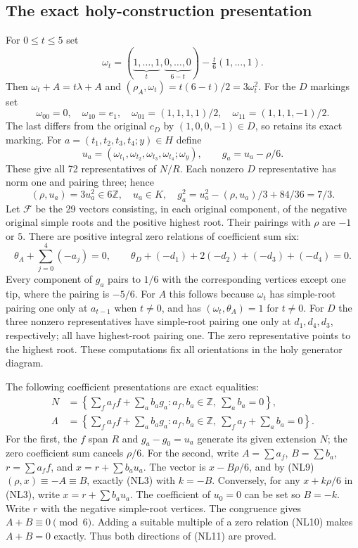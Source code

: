 \subsection{The exact holy-construction presentation}

For $0\le t\le5$ set
\[
 \omega_t=(\underbrace{1,\ldots,1}_{t},
             \underbrace{0,\ldots,0}_{6-t})-\tfrac t6(1,\ldots,1).
\]
Then $\omega_t+A=t\lambda+A$ and
$(\rho_A,\omega_t)=t(6-t)/2=3\omega_t^2$.
For the $D$ markings set
\[
 \omega_{00}=0,\quad\omega_{10}=e_1,\quad
 \omega_{01}=(1,1,1,1)/2,\quad
 \omega_{11}=(1,1,1,-1)/2.
\]
The last differs from the original $c_D$ by $(1,0,0,-1)\in D$,
so retains its exact marking.
For $a=(t_1,t_2,t_3,t_4;y)\in H$ define
\[
 u_a=(\omega_{t_1},\omega_{t_2},\omega_{t_3},\omega_{t_4};\omega_y),
 \qquad g_a=u_a-\rho/6.
 \tag{NL8}
\]
These give all 72 representatives of $N/R$. Each nonzero $D$
representative has norm one and pairing three; hence
\[
 (\rho,u_a)=3u_a^2\in6\mathbb Z,\quad
 u_a\in K,\quad g_a^2=u_a^2-(\rho,u_a)/3+84/36=7/3.
 \tag{NL9}
\]
Let $\mathcal F$ be the 29 vectors consisting, in each original
component, of the negative original simple roots and the positive
highest root. Their pairings with $\rho$ are $-1$ or $5$.
There are positive integral zero relations of coefficient sum six:
\[
 \theta_A+\sum_{j=0}^4(-a_j)=0,\qquad
 \theta_D+(-d_1)+2(-d_2)+(-d_3)+(-d_4)=0.
 \tag{NL10}
\]
Every component of $g_a$ pairs to $1/6$ with the corresponding
vertices except one tip, where the pairing is $-5/6$.
For $A$ this follows because $\omega_t$ has simple-root pairing
one only at $a_{t-1}$ when $t\ne0$, and has
$(\omega_t,\theta_A)=1$ for $t\ne0$.
For $D$ the three nonzero representatives have simple-root
pairing one only at $d_1,d_4,d_3$, respectively; all have
highest-root pairing one. The zero representative points to
the highest root. These computations fix all orientations in
the holy generator diagram.

The following coefficient presentations are exact equalities:
\[
 \begin{split}
 N&=\left\{\sum_fa_ff+\sum_ab_ag_a:
                    a_f,b_a\in\mathbb Z,\ \sum_ab_a=0\right\},\\
 \Lambda&=\left\{\sum_fa_ff+\sum_ab_ag_a:
            a_f,b_a\in\mathbb Z,\ \sum_fa_f+\sum_ab_a=0\right\}.
 \end{split}
 \tag{NL11}
\]
For the first, the $f$ span $R$ and $g_a-g_0=u_a$ generate its
given extension $N$; the zero coefficient sum cancels $\rho/6$.
For the second, write $A=\sum a_f$, $B=\sum b_a$,
$r=\sum a_ff$, and $x=r+\sum b_au_a$.
The vector is $x-B\rho/6$, and by (NL9)
$(\rho,x)\equiv-A\equiv B$, exactly (NL3) with $k=-B$.
Conversely, for any $x+k\rho/6$ in (NL3), write
$x=r+\sum b_au_a$. The coefficient of $u_0=0$ can be set so
$B=-k$. Write $r$ with the negative simple-root vertices.
The congruence gives $A+B\equiv0\pmod6$.
Adding a suitable multiple of a zero relation (NL10) makes
$A+B=0$ exactly. Thus both directions of (NL11) are proved.

